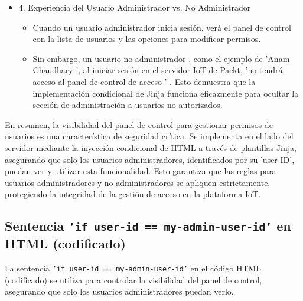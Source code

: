 \documentclass{report}
\begin{document}
\begin{itemize}
    \item 4. Experiencia del Usuario Administrador vs. No Administrador
    \begin{itemize}
        \item Cuando un  usuario administrador  inicia sesión, verá el panel de control con la lista de usuarios y las opciones para modificar permisos.
        \item Sin embargo, un  usuario no administrador , como el ejemplo de  'Anam Chaudhary ', al iniciar sesión en el servidor IoT de Packt, 
        'no tendrá acceso al panel de control de acceso ' . Esto demuestra que la implementación condicional de Jinja funciona eficazmente para 
        ocultar la sección de administración a usuarios no autorizados.    
    \end{itemize}
\end{itemize}

En resumen, la visibilidad del panel de control para gestionar permisos de usuarios es una característica de seguridad crítica. Se implementa en el lado 
del servidor mediante la inyección condicional de HTML a través de plantillas Jinja, asegurando que solo los usuarios administradores, identificados por 
su 'user ID', puedan ver y utilizar esta funcionalidad. Esto garantiza que las reglas para usuarios administradores y no administradores se apliquen 
estrictamente, protegiendo la integridad de la gestión de acceso en la plataforma IoT.

\subsection{Sentencia \texttt{'if user-id == my-admin-user-id'} en HTML (codificado)}

La sentencia \texttt{'if user-id == my-admin-user-id'} en el código HTML (codificado) se utiliza para controlar la visibilidad del panel de control, 
asegurando que solo los usuarios administradores puedan verlo.
\end{document}
